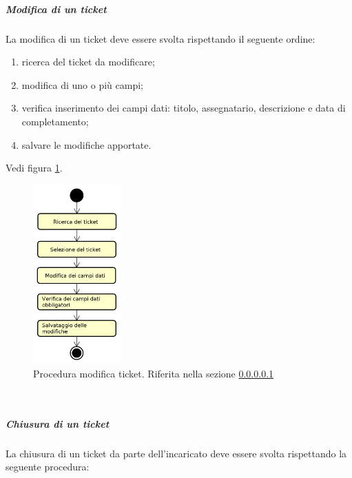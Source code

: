 	            \subparagraph{Modifica di un ticket}\label{sec:modificaticket}
	                La modifica di un ticket deve essere svolta rispettando il seguente ordine:
	                \begin{enumerate}
	                	\item ricerca del ticket da modificare;
	                	\item modifica di uno o più campi;
	                	\item verifica inserimento dei campi dati: titolo, assegnatario, descrizione e data di completamento;
	                	\item salvare le modifiche apportate.
	                \end{enumerate}
	                Vedi figura \ref{fig:procmodticket}.
	                    \begin{figure}[h!]
	                        \centering
	        	        	\includegraphics[width=0.3\textwidth]{img/proc_mod_ticket}
	                        \caption{Procedura modifica ticket. Riferita nella sezione \ref{sec:modificaticket}}
	                        \label{fig:procmodticket}
	        	        \end{figure}\mbox{}\\
	            \subparagraph{Chiusura di un ticket}\label{sec:chiusuraticket}
	            La chiusura di un ticket da parte dell'incaricato deve essere svolta rispettando la seguente procedura:
